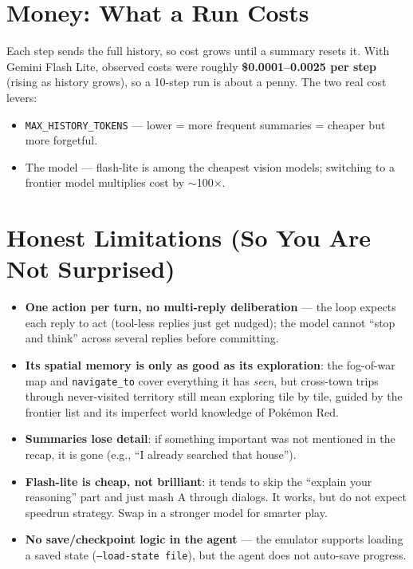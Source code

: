 \documentclass[11pt]{article}
\newcommand{\code}[1]{\texttt{#1}}
\begin{document}
\section{Money: What a Run Costs}

Each step sends the full history, so cost grows until a summary resets it. With Gemini Flash Lite, observed costs were roughly \textbf{\$0.0001--0.0025 per step} (rising as history grows), so a 10-step run is about a penny. The two real cost levers:

\begin{itemize}[nosep]
  \item \code{MAX\_HISTORY\_TOKENS} --- lower = more frequent summaries = cheaper but more forgetful.
  \item The model --- flash-lite is among the cheapest vision models; switching to a frontier model multiplies cost by $\sim$100$\times$.
\end{itemize}

\section{Honest Limitations (So You Are Not Surprised)}

\begin{itemize}
  \item \textbf{One action per turn, no multi-reply deliberation} --- the loop expects each reply to act (tool-less replies just get nudged); the model cannot ``stop and think'' across several replies before committing.
  \item \textbf{Its spatial memory is only as good as its exploration}: the fog-of-war map and \code{navigate\_to} cover everything it has \emph{seen}, but cross-town trips through never-visited territory still mean exploring tile by tile, guided by the frontier list and its imperfect world knowledge of Pokémon Red.
  \item \textbf{Summaries lose detail}: if something important was not mentioned in the recap, it is gone (e.g., ``I already searched that house'').
  \item \textbf{Flash-lite is cheap, not brilliant}: it tends to skip the ``explain your reasoning'' part and just mash A through dialogs. It works, but do not expect speedrun strategy. Swap in a stronger model for smarter play.
  \item \textbf{No save/checkpoint logic in the agent} --- the emulator supports loading a saved state (\code{--load-state file}), but the agent does not auto-save progress.
\end{itemize}
\end{document}
